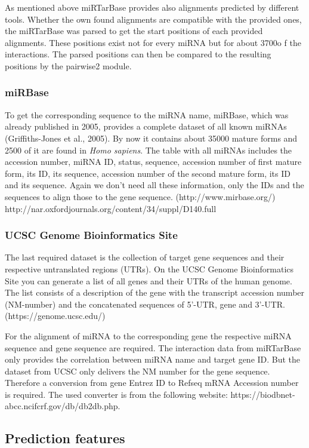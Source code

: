 \documentclass[12pt]{article}
\begin{document}
As mentioned above miRTarBase provides also alignments predicted by different tools. Whether the own found alignments are compatible with the provided ones, the miRTarBase was parsed to get the start positions of each provided alignments. These positions exist not for every miRNA but for about 3700o f the interactions. The parsed positions can then be compared to the resulting positions by the pairwise2 module. 

\subsubsection{miRBase}
To get the corresponding sequence to the miRNA name, miRBase, which was already published in 2005, provides a complete dataset of all known miRNAs (Griffiths-Jones et al., 2005). By now it contains about 35000 mature forms and 2500 of it are found in \textit{Homo sapiens}. The table with all miRNAs includes the accession number, miRNA ID, status, sequence, accession number of first mature form, its ID, its sequence, accession number of the second mature form, its ID and its sequence. Again we don't need all these information, only the IDs and the sequences to align those to the gene sequence. (http://www.mirbase.org/) http://nar.oxfordjournals.org/content/34/suppl/D140.full 

\subsubsection{UCSC Genome Bioinformatics Site}
The last required dataset is the collection of target gene sequences and their respective untranslated regions (UTRs). On the UCSC Genome Bioinformatics Site you can generate a list of all genes and their UTRs of the human genome. The list consists of a description of the gene with the transcript accession number (NM-number) and the concatenated sequences of 5'-UTR, gene and 3'-UTR. (https://genome.ucsc.edu/) 

For the alignment of miRNA to the corresponding gene the respective miRNA sequence and gene sequence are required. The interaction data from miRTarBase only provides the correlation between miRNA name and target gene ID. But the dataset from UCSC only delivers the NM number for the gene sequence. Therefore a conversion from gene Entrez ID to Refseq mRNA Accession number is required. The used converter is from the following website: https://biodbnet-abcc.ncifcrf.gov/db/db2db.php.
 

\subsection{Prediction features}
\end{document}
